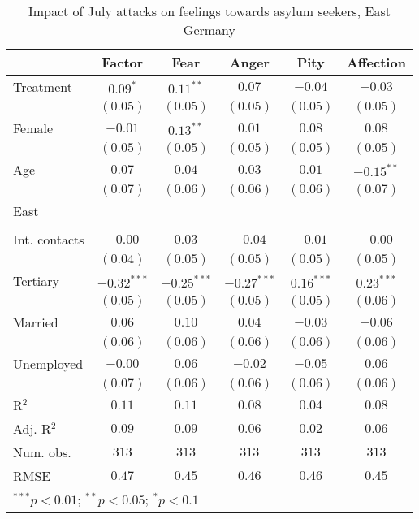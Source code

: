 
\begin{table}
\caption{Impact of July attacks on feelings towards asylum seekers, East Germany}
\begin{center}
\begin{tabular}{l c c c c c}
\toprule
 & Factor & Fear & Anger & Pity & Affection \\
\midrule
Treatment     & $0.09^{*}$    & $0.11^{**}$   & $0.07$        & $-0.04$      & $-0.03$      \\
              & $(0.05)$      & $(0.05)$      & $(0.05)$      & $(0.05)$     & $(0.05)$     \\
Female        & $-0.01$       & $0.13^{**}$   & $0.01$        & $0.08$       & $0.08$       \\
              & $(0.05)$      & $(0.05)$      & $(0.05)$      & $(0.05)$     & $(0.05)$     \\
Age           & $0.07$        & $0.04$        & $0.03$        & $0.01$       & $-0.15^{**}$ \\
              & $(0.07)$      & $(0.06)$      & $(0.06)$      & $(0.06)$     & $(0.07)$     \\
East          &               &               &               &              &              \\
              &               &               &               &              &              \\
Int. contacts & $-0.00$       & $0.03$        & $-0.04$       & $-0.01$      & $-0.00$      \\
              & $(0.04)$      & $(0.05)$      & $(0.05)$      & $(0.05)$     & $(0.05)$     \\
Tertiary      & $-0.32^{***}$ & $-0.25^{***}$ & $-0.27^{***}$ & $0.16^{***}$ & $0.23^{***}$ \\
              & $(0.05)$      & $(0.05)$      & $(0.05)$      & $(0.05)$     & $(0.06)$     \\
Married       & $0.06$        & $0.10$        & $0.04$        & $-0.03$      & $-0.06$      \\
              & $(0.06)$      & $(0.06)$      & $(0.06)$      & $(0.06)$     & $(0.06)$     \\
Unemployed    & $-0.00$       & $0.06$        & $-0.02$       & $-0.05$      & $0.06$       \\
              & $(0.07)$      & $(0.06)$      & $(0.06)$      & $(0.06)$     & $(0.06)$     \\
\midrule
R$^2$         & $0.11$        & $0.11$        & $0.08$        & $0.04$       & $0.08$       \\
Adj. R$^2$    & $0.09$        & $0.09$        & $0.06$        & $0.02$       & $0.06$       \\
Num. obs.     & $313$         & $313$         & $313$         & $313$        & $313$        \\
RMSE          & $0.47$        & $0.45$        & $0.46$        & $0.46$       & $0.45$       \\
\bottomrule
\multicolumn{6}{l}{\scriptsize{$^{***}p<0.01$; $^{**}p<0.05$; $^{*}p<0.1$}}
\end{tabular}
\label{tab_emo_east}
\end{center}
\end{table}
